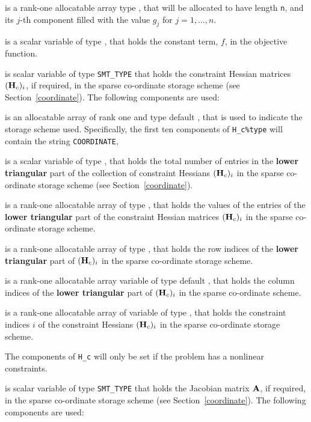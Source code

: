 \documentclass{galahad}
\begin{document}
\begin{description}
 is a rank-one allocatable array type \realdp, that
will be allocated to have length {\tt n}, and its $j$-th component
filled with the value $g_{j}$ for $j = 1, \ldots , n$.

 is a scalar variable of type \realdp, that holds the
constant term, $f$, in the objective function.

 is scalar variable of type {\tt SMT\_TYPE}
that holds the constraint Hessian matrices $({\mathbf{H}}_c)_i$, if required,
in the sparse co-ordinate storage scheme (see Section~\ref{coordinate}).
The following components are used:

\begin{description}

 is an allocatable array of rank one and type default
\character, that is used to indicate the storage scheme used. Specifically,
the first ten components of {\tt H\_c\%type} will contain the
string {\tt COORDINATE},

 is a scalar variable of type \integer, that
holds the total number of entries in the {\bf lower triangular} part of 
the collection of constraint Hessians $({\mathbf{H}}_c)_i$
in the sparse co-ordinate storage scheme (see Section~\ref{coordinate}).

 is a rank-one allocatable array of type \realdp, that
holds the values of the entries of the {\bf lower triangular} part
of the constraint Hessian matrices $({\mathbf{H}}_c)_i$ 
in the sparse co-ordinate storage scheme.

 is a rank-one allocatable array of type \integer,
that holds the row indices of the {\bf lower triangular} part of 
$({\mathbf{H}}_c)_i$ in the sparse co-ordinate storage scheme.

 is a rank-one allocatable array variable of type default
\integer, that holds the column indices of the {\bf lower triangular} part of
$({\mathbf{H}}_c)_i$ in the sparse co-ordinate scheme.

 is a rank-one allocatable array of variable of type
\integer, that holds the constraint indices $i$
of the constraint Hessians $({\mathbf{H}}_c)_i$
in the sparse co-ordinate storage scheme.
\end{description}

The components of {\tt H\_c} will only be set if the problem has a
nonlinear constraints.

 is scalar variable of type {\tt SMT\_TYPE}
that holds the Jacobian matrix ${\mathbf{A}}$, if required,
in the sparse co-ordinate storage scheme (see Section~\ref{coordinate}).
The following components are used:


\end{description}
\end{document}
